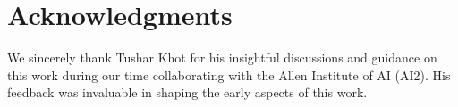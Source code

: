 \section{Acknowledgments}
We sincerely thank Tushar Khot for his insightful discussions and guidance on this work during our time collaborating with the Allen Institute of AI (AI2). His feedback was invaluable in shaping the early aspects of this work.